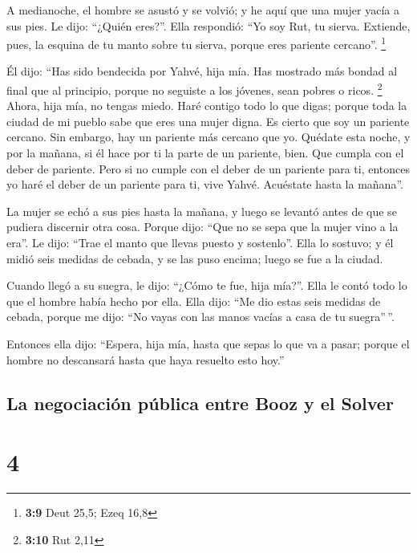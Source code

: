  A medianoche, el hombre se asustó y se volvió; y he aquí
que una mujer yacía a sus pies.  Le dijo: ``¿Quién
eres?''. Ella respondió: ``Yo soy Rut, tu sierva. Extiende, pues, la
esquina de tu manto sobre tu sierva, porque eres pariente cercano''.
\footnote{\textbf{3:9} Deut 25,5; Ezeq 16,8}

 Él dijo: ``Has sido bendecida por Yahvé, hija mía. Has
mostrado más bondad al final que al principio, porque no seguiste a los
jóvenes, sean pobres o ricos. \footnote{\textbf{3:10} Rut 2,11}
 Ahora, hija mía, no tengas miedo. Haré contigo todo lo
que digas; porque toda la ciudad de mi pueblo sabe que eres una mujer
digna.  Es cierto que soy un pariente cercano. Sin
embargo, hay un pariente más cercano que yo.  Quédate
esta noche, y por la mañana, si él hace por ti la parte de un pariente,
bien. Que cumpla con el deber de pariente. Pero si no cumple con el
deber de un pariente para ti, entonces yo haré el deber de un pariente
para ti, vive Yahvé. Acuéstate hasta la mañana''.

 La mujer se echó a sus pies hasta la mañana, y luego se
levantó antes de que se pudiera discernir otra cosa. Porque dijo: ``Que
no se sepa que la mujer vino a la era''.  Le dijo: ``Trae
el manto que llevas puesto y sostenlo''. Ella lo sostuvo; y él midió
seis medidas de cebada, y se las puso encima; luego se fue a la ciudad.

 Cuando llegó a su suegra, le dijo: ``¿Cómo te fue, hija
mía?''. Ella le contó todo lo que el hombre había hecho por ella.
 Ella dijo: ``Me dio estas seis medidas de cebada, porque
me dijo: ``No vayas con las manos vacías a casa de tu suegra''\,''.

 Entonces ella dijo: ``Espera, hija mía, hasta que sepas
lo que va a pasar; porque el hombre no descansará hasta que haya
resuelto esto hoy.''

\hypertarget{la-negociaciuxf3n-puxfablica-entre-booz-y-el-solver}{%
\subsection{La negociación pública entre Booz y el
Solver}\label{la-negociaciuxf3n-puxfablica-entre-booz-y-el-solver}}

\hypertarget{section-3}{%
\section{4}\label{section-3}}

